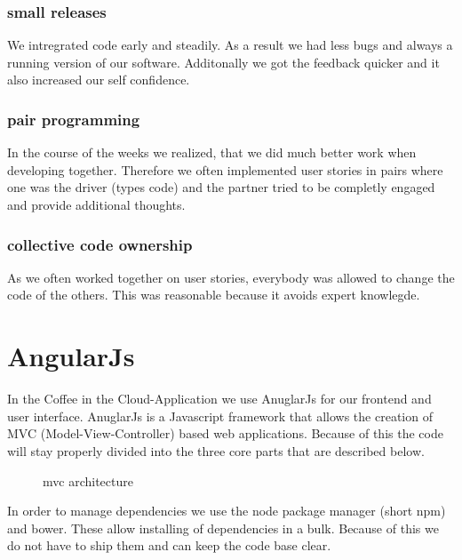 \subsubsection{small releases}\label{small-releases}

We intregrated code early and steadily. As a result we had less bugs and
always a running version of our software. Additonally we got the
feedback quicker and it also increased our self confidence.

\subsubsection{pair programming}\label{pair-programming}

In the course of the weeks we realized, that we did much better work
when developing together. Therefore we often implemented user stories in
pairs where one was the driver (types code) and the partner tried to be
completly engaged and provide additional thoughts.

\subsubsection{collective code
ownership}\label{collective-code-ownership}

As we often worked together on user stories, everybody was allowed to
change the code of the others. This was reasonable because it avoids
expert knowlegde.

\newpage
\section{AngularJs}\label{angularjs}

In the Coffee in the Cloud-Application we use AnuglarJs for our frontend
and user interface. AnuglarJs is a Javascript framework that allows the
creation of MVC (Model-View-Controller) based web applications. Because
of this the code will stay properly divided into the three core parts
that are described below.

\begin{figure}[htbp]
\centering
{}
\caption{mvc architecture}
\end{figure}

In order to manage dependencies we use the node package manager (short
npm) and bower. These allow installing of dependencies in a bulk.
Because of this we do not have to ship them and can keep the code base
clear.

